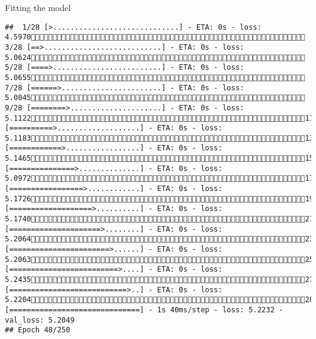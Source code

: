 \documentclass[
  ignorenonframetext,
]{beamer}
\begin{document}
\begin{frame}[fragile]{Fitting the model}
\begin{verbatim}
##  1/28 [>.............................] - ETA: 0s - loss: 4.5970 3/28 [==>...........................] - ETA: 0s - loss: 5.0624 5/28 [====>.........................] - ETA: 0s - loss: 5.0655 7/28 [======>.......................] - ETA: 0s - loss: 5.0045 9/28 [========>.....................] - ETA: 0s - loss: 5.112211/28 [==========>...................] - ETA: 0s - loss: 5.118313/28 [============>.................] - ETA: 0s - loss: 5.146515/28 [===============>..............] - ETA: 0s - loss: 5.097217/28 [=================>............] - ETA: 0s - loss: 5.172619/28 [===================>..........] - ETA: 0s - loss: 5.174021/28 [=====================>........] - ETA: 0s - loss: 5.206423/28 [=======================>......] - ETA: 0s - loss: 5.206325/28 [=========================>....] - ETA: 0s - loss: 5.243527/28 [===========================>..] - ETA: 0s - loss: 5.220428/28 [==============================] - 1s 40ms/step - loss: 5.2232 - val_loss: 5.2049
## Epoch 48/250

\end{verbatim}
\end{frame}
\end{document}
